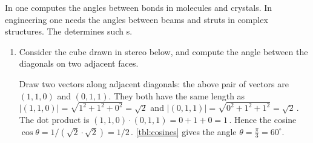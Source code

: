 \begin{example} \label{eg:}
In  one computes the angles between bonds in molecules and crystals.  
In engineering one needs the angles between beams and struts in complex structures.
The  determines such s.
\begin{enumerate}
\item Consider the cube drawn in stereo below, and compute the angle between the diagonals on two adjacent faces.
\begin{center}
 {}
\end{center}
\begin{solution} 
Draw two vectors along adjacent diagonals: the above pair of vectors are \((1,1,0)\) and \((0,1,1)\).
They both have the same length as \(|(1,1,0)|=\sqrt{1^2+1^2+0^2}=\sqrt2\) and \(|(0,1,1)|=\sqrt{0^2+1^2+1^2}=\sqrt2\)\,.
The dot product is \((1,1,0)\cdot(0,1,1)=0+1+0=1\)\,.
Hence the cosine \(\cos\theta=1/(\sqrt2\cdot\sqrt2)=1/2\)\,.
\autoref{tbl:cosines} gives the angle \(\theta=\frac\pi3=60^\circ\).
\end{solution}



\end{enumerate}
\end{example}
